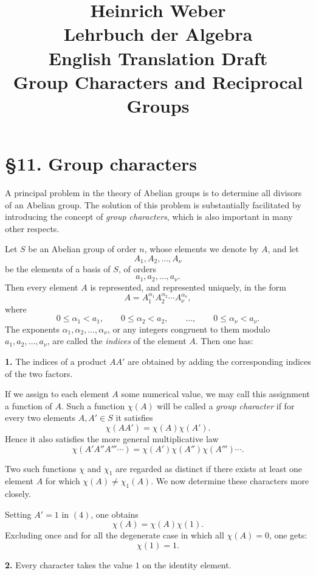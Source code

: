 \documentclass[11pt]{article}
\title{Heinrich Weber\\Lehrbuch der Algebra\\English Translation Draft\\Group Characters and Reciprocal Groups}
\author{}
\date{}
\begin{document}
\maketitle

\section*{\S 11. Group characters}

A principal problem in the theory of Abelian groups is to determine all divisors of an Abelian group. The solution of this problem is substantially facilitated by introducing the concept of \emph{group characters}, which is also important in many other respects.

Let \(S\) be an Abelian group of order \(n\), whose elements we denote by \(A\), and let
\[
A_1,A_2,\dots,A_\nu
\tag{1}
\]
be the elements of a basis of \(S\), of orders
\[
a_1,a_2,\dots,a_\nu.
\]
Then every element \(A\) is represented, and represented uniquely, in the form
\[
A = A_1^{\alpha_1}A_2^{\alpha_2}\cdots A_\nu^{\alpha_\nu},
\tag{2}
\]
where
\[
0\le \alpha_1<a_1,\qquad 0\le \alpha_2<a_2,\qquad \dots,\qquad 0\le \alpha_\nu<a_\nu.
\tag{3}
\]
The exponents \(\alpha_1,\alpha_2,\dots,\alpha_\nu\), or any integers congruent to them modulo \(a_1,a_2,\dots,a_\nu\), are called the \emph{indices} of the element \(A\). Then one has:

\medskip
\noindent\textbf{1.} The indices of a product \(AA'\) are obtained by adding the corresponding indices of the two factors.

\medskip
If we assign to each element \(A\) some numerical value, we may call this assignment a function of \(A\). Such a function \(\chi(A)\) will be called a \emph{group character} if for every two elements \(A,A'\in S\) it satisfies
\[
\chi(AA')=\chi(A)\chi(A').
\tag{4}
\]
Hence it also satisfies the more general multiplicative law
\[
\chi(A'A''A'''\cdots)=\chi(A')\chi(A'')\chi(A''')\cdots.
\]

Two such functions \(\chi\) and \(\chi_1\) are regarded as distinct if there exists at least one element \(A\) for which \(\chi(A)\neq \chi_1(A)\). We now determine these characters more closely.

Setting \(A'=1\) in \((4)\), one obtains
\[
\chi(A)=\chi(A)\chi(1).
\tag{5}
\]
Excluding once and for all the degenerate case in which all \(\chi(A)=0\), one gets:
\[
\chi(1)=1.
\tag{6}
\]

\medskip
\noindent\textbf{2.} Every character takes the value \(1\) on the identity element.
\end{document}
